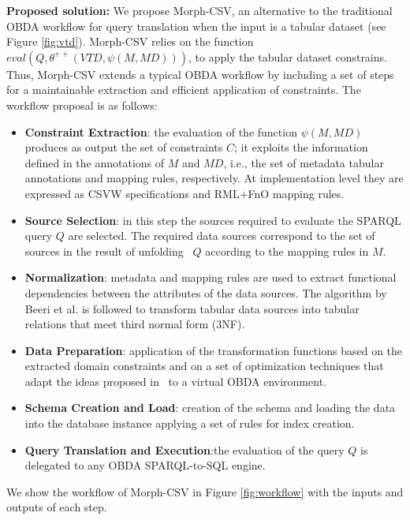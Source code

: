 \noindent\textbf{Proposed solution:} We propose Morph-CSV, an alternative to the traditional OBDA workflow for query translation when the input is a tabular dataset (see Figure \ref{fig:vtd}). Morph-CSV relies on the function $eval(Q,\theta^{++}(VTD,\psi(M,MD)))$, to apply the tabular dataset constrains. Thus, Morph-CSV extends a typical OBDA workflow by including a set of steps for a maintainable extraction and efficient application of constraints. The workflow proposal is as follows:
\begin{itemize}
    \item \textbf{Constraint Extraction}: the evaluation of the function $\psi(M,MD)$ produces as output the set of constraints $C$; it exploits the information defined in the annotations of $M$ and $MD$, i.e., the set of metadata tabular annotations and mapping rules, respectively. At implementation level they are expressed as CSVW specifications and RML+FnO mapping rules. 
    \item \textbf{Source Selection}: in this step the sources required to evaluate the SPARQL query $Q$ are selected. The required data sources correspond to the set of sources in the result of unfolding~\citep{poggi2008linking} $Q$ according to the mapping rules in $M$. 
    \item \textbf{Normalization}: metadata and mapping rules are used to extract functional dependencies between the attributes of the data sources. The algorithm by Beeri et al. \citep{Beeri1978ASI} is followed to transform tabular data sources into tabular relations that meet third normal form (3NF).  
    \item \textbf{Data Preparation}: application of the transformation functions based on the extracted domain constraints and on a set of optimization techniques that adapt the ideas proposed in~\citep{jozashoori2019mapsdi,iglesias2020sdm,jozashoori2020funmap} to a virtual OBDA environment. 
    \item \textbf{Schema Creation and Load}: creation of the schema and loading the data into the database instance applying a set of rules for index creation. 
    \item \textbf{Query Translation and Execution}:the evaluation of the query $Q$ is delegated to any OBDA SPARQL-to-SQL engine.
\end{itemize}
 We show the workflow of Morph-CSV in Figure \ref{fig:workflow} with the inputs and outputs of each step. 


